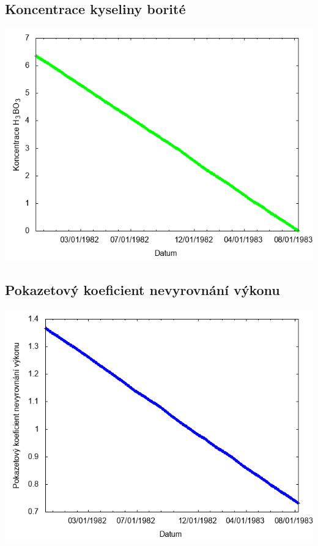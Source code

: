 \documentclass[a4paper,twoside,11pt]{article}
\begin{document}
\subsection*{Koncentrace kyseliny borité}
\begin{center}
\includegraphics[width=.8\textwidth]{graphs/Disneyland_18_bc.png}
\end{center}

\subsection*{Pokazetový koeficient nevyrovnání výkonu}
\begin{center}
\includegraphics[width=.8\textwidth]{graphs/Disneyland_18_fha.png}
\end{center}

\newpage
\end{document}
